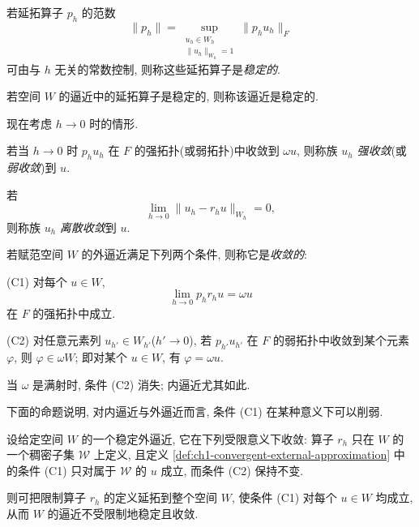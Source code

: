 \begin{Definition}
\label{def:ch1-stable-approximation}
若延拓算子 $p_h$ 的范数
\[
\|p_h\|=\sup_{\substack{u_h\in W_h\\\|u_h\|_{W_h}=1}}\|p_hu_h\|_F
\]
可由与 $h$ 无关的常数控制, 则称这些延拓算子是\emph{稳定的}.

若空间 $W$ 的逼近中的延拓算子是稳定的, 则称该逼近是稳定的.
\end{Definition}

现在考虑 $h\to0$ 时的情形.

\begin{Definition}
\label{def:ch1-strong-weak-discrete-convergence}
若当 $h\to0$ 时 $p_hu_h$ 在 $F$ 的强拓扑(或弱拓扑)中收敛到 $\omega u$, 则称族 $u_h$ \emph{强收敛}(或\emph{弱收敛})到 $u$.

若
\[
\lim_{h\to0}\|u_h-r_hu\|_{W_h}=0,
\]
则称族 $u_h$ \emph{离散收敛}到 $u$.
\end{Definition}

\begin{Definition}
\label{def:ch1-convergent-external-approximation}
若赋范空间 $W$ 的外逼近满足下列两个条件, 则称它是\emph{收敛的}:

(C1) 对每个 $u\in W$,
\[
\lim_{h\to0}p_hr_hu=\omega u
\]
在 $F$ 的强拓扑中成立.

(C2) 对任意元素列 $u_{h'}\in W_{h'}$($h'\to0$), 若 $p_{h'}u_{h'}$ 在 $F$ 的弱拓扑中收敛到某个元素 $\varphi$, 则 $\varphi\in\omega W$; 即对某个 $u\in W$, 有 $\varphi=\omega u$.
\end{Definition}

\begin{Remark}
\label{rem:ch1-convergence-condition-c2}
当 $\omega$ 是满射时, 条件 (C2) 消失; 内逼近尤其如此.
\end{Remark}

下面的命题说明, 对内逼近与外逼近而言, 条件 (C1) 在某种意义下可以削弱.

\begin{Proposition}
\label{prop:ch1-extend-restriction-operators}
设给定空间 $W$ 的一个稳定外逼近, 它在下列受限意义下收敛: 算子 $r_h$ 只在 $W$ 的一个稠密子集 $\mathcal W$ 上定义, 且定义 \ref{def:ch1-convergent-external-approximation} 中的条件 (C1) 只对属于 $\mathcal W$ 的 $u$ 成立, 而条件 (C2) 保持不变.

则可把限制算子 $r_h$ 的定义延拓到整个空间 $W$, 使条件 (C1) 对每个 $u\in W$ 均成立, 从而 $W$ 的逼近不受限制地稳定且收敛.
\end{Proposition}

